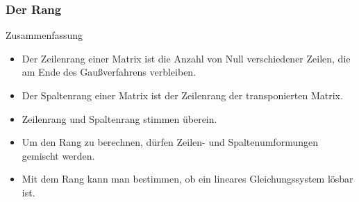 \documentclass{beamer}
\renewcommand{\oe}{\"o}
\newcommand{\ue}{\"u}
\newcommand{\mytitle}{Der Rang}
\begin{document}
\begin{frame}\frametitle{\mytitle}
\begin{block}{Zusammenfassung}
\begin{itemize}
	\item Der Zeilenrang einer Matrix ist die Anzahl von Null verschiedener Zeilen, die am Ende des Gau\ss verfahrens verbleiben.
	\item Der Spaltenrang einer Matrix ist der Zeilenrang der transponierten Matrix.
	\item Zeilenrang und Spaltenrang stimmen \ue berein.
	\item Um den Rang zu berechnen, d\ue rfen Zeilen- und Spaltenumformungen gemischt werden.
	\item Mit dem Rang kann man bestimmen, ob ein lineares Gleichungssystem l\oe sbar ist.
\end{itemize}
	\end{block}
\end{frame}
\end{document}
